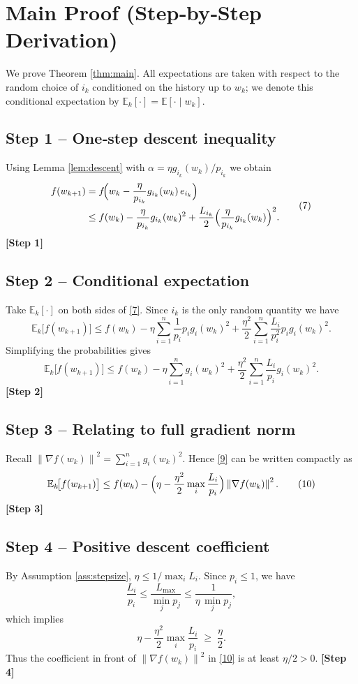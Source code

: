 \documentclass{article}
\newcommand{\EE}{\mathbb{E}}
\newcommand{\norm}[1]{\left\lVert #1\right\rVert}
\begin{document}
\section*{Main Proof (Step‑by‑Step Derivation)}
We prove Theorem \ref{thm:main}. All expectations are taken with respect to the random choice of $i_k$ conditioned on the history up to $w_k$; we denote this conditional expectation by $\EE_k[\cdot]=\EE[\cdot\mid w_k]$.

\subsection*{Step 1 – One‑step descent inequality}
Using Lemma \ref{lem:descent} with $\alpha = \eta g_{i_k}(w_k)/p_{i_k}$ we obtain
\[
\begin{aligned}
f(w_{k+1})
&= f\!\Bigl(w_k-\frac{\eta}{p_{i_k}}g_{i_k}(w_k)\,e_{i_k}\Bigr) \\
&\le f(w_k)-\frac{\eta}{p_{i_k}}g_{i_k}(w_k)^{2}
      +\frac{L_{i_k}}{2}\Bigl(\frac{\eta}{p_{i_k}}g_{i_k}(w_k)\Bigr)^{2}.
\end{aligned}
\tag{7}
\]
\textbf{[Step 1]}

\subsection*{Step 2 – Conditional expectation}
Take $\EE_k[\cdot]$ on both sides of \eqref{7}. Since $i_k$ is the only random quantity we have
\[
\EE_k\!\bigl[f(w_{k+1})\bigr]\le
f(w_k)-\eta\sum_{i=1}^{n}\frac{1}{p_i}p_i g_i(w_k)^{2}
+\frac{\eta^{2}}{2}\sum_{i=1}^{n}\frac{L_i}{p_i^{2}}p_i g_i(w_k)^{2}.
\tag{8}
\]
Simplifying the probabilities gives
\[
\EE_k\!\bigl[f(w_{k+1})\bigr]\le
f(w_k)-\eta\sum_{i=1}^{n} g_i(w_k)^{2}
+\frac{\eta^{2}}{2}\sum_{i=1}^{n}\frac{L_i}{p_i} g_i(w_k)^{2}.
\tag{9}
\]
\textbf{[Step 2]}

\subsection*{Step 3 – Relating to full gradient norm}
Recall $\norm{\nabla f(w_k)}^{2}= \sum_{i=1}^{n} g_i(w_k)^{2}$. Hence \eqref{9} can be written compactly as
\[
\EE_k\!\bigl[f(w_{k+1})\bigr]\le
f(w_k)-\Bigl(\eta-\frac{\eta^{2}}{2}\max_{i}\frac{L_i}{p_i}\Bigr)\norm{\nabla f(w_k)}^{2}.
\tag{10}
\]
\textbf{[Step 3]}

\subsection*{Step 4 – Positive descent coefficient}
By Assumption \ref{ass:stepsize}, $\eta\le 1/\max_i L_i$. Since $p_i\le 1$, we have
\[
\frac{L_i}{p_i}\le \frac{L_{\max}}{\min_j p_j}\le \frac{1}{\eta\,\min_j p_j},
\]
which implies
\[
\eta-\frac{\eta^{2}}{2}\max_i\frac{L_i}{p_i}\;\ge\;\frac{\eta}{2}.
\tag{11}
\]
Thus the coefficient in front of $\norm{\nabla f(w_k)}^{2}$ in \eqref{10} is at least $\eta/2>0$.
\textbf{[Step 4]}
\end{document}
